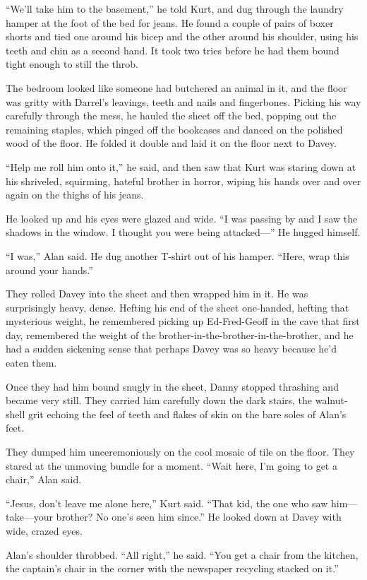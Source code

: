 \documentclass{article}
\begin{document}
``We'll take him to the basement,'' he told Kurt, and dug through the
laundry hamper at the foot of the bed for jeans.  He found a couple of
pairs of boxer shorts and tied one around his bicep and the other
around his shoulder, using his teeth and chin as a second hand.  It
took two tries before he had them bound tight enough to still the
throb.

The bedroom looked like someone had butchered an animal in it, and the
floor was gritty with Darrel's leavings, teeth and nails and
fingerbones.  Picking his way carefully through the mess, he hauled
the sheet off the bed, popping out the remaining staples, which pinged
off the bookcases and danced on the polished wood of the floor.  He
folded it double and laid it on the floor next to Davey.

``Help me roll him onto it,'' he said, and then saw that Kurt was
staring down at his shriveled, squirming, hateful brother in horror,
wiping his hands over and over again on the thighs of his jeans.

He looked up and his eyes were glazed and wide.  ``I was passing by
and I saw the shadows in the window.  I thought you were being
attacked---'' He hugged himself.

``I was,'' Alan said.  He dug another T-shirt out of his hamper. 
``Here, wrap this around your hands.''

They rolled Davey into the sheet and then wrapped him in it.  He was
surprisingly heavy, dense.  Hefting his end of the sheet one-handed,
hefting that mysterious weight, he remembered picking up Ed-Fred-Geoff
in the cave that first day, remembered the weight of the
brother-in-the-brother-in-the-brother, and he had a sudden sickening
sense that perhaps Davey was so heavy because he'd eaten them.

Once they had him bound snugly in the sheet, Danny stopped thrashing
and became very still.  They carried him carefully down the dark
stairs, the walnut-shell grit echoing the feel of teeth and flakes of
skin on the bare soles of Alan's feet.

They dumped him unceremoniously on the cool mosaic of tile on the
floor.  They stared at the unmoving bundle for a moment.  ``Wait here,
I'm going to get a chair,'' Alan said.

``Jesus, don't leave me alone here,'' Kurt said.  ``That kid, the one
who saw him---take---your brother?  No one's seen him since.'' He
looked down at Davey with wide, crazed eyes.

Alan's shoulder throbbed.  ``All right,'' he said.  ``You get a chair
from the kitchen, the captain's chair in the corner with the newspaper
recycling stacked on it.''
\end{document}
